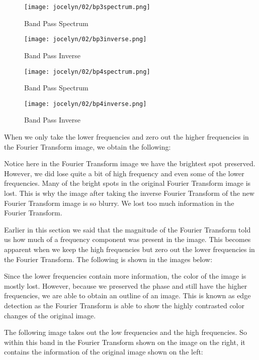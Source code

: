 \documentclass [../article.tex]{subfiles}
\begin{document}
  \begin{figure}[!htb]
      \texttt{[image: jocelyn/02/bp3spectrum.png]}
      \caption{Band Pass Spectrum}
      \label{fig:bp3spectrum}
    \endminipage\hfill
      \texttt{[image: jocelyn/02/bp3inverse.png]}
      \caption{Band Pass Inverse}
      \label{fig:bp3inverse}
    \endminipage
  \end{figure}
  \begin{figure}[!htb]
      \texttt{[image: jocelyn/02/bp4spectrum.png]}
      \caption{Band Pass Spectrum}
      \label{fig:bp4spectrum}
    \endminipage\hfill
      \texttt{[image: jocelyn/02/bp4inverse.png]}
      \caption{Band Pass Inverse}
      \label{fig:bp4inverse}
    \endminipage
  \end{figure}
  When we only take the lower frequencies and zero out the higher
  frequencies in the Fourier Transform image, we obtain the
  following:

  Notice here in the Fourier Transform image we have the brightest
  spot preserved.  However, we did lose quite a bit of high
  frequency and even some of the lower frequencies.  Many of the
  bright spots in the original Fourier Transform image is lost.
  This is why the image after taking the inverse Fourier Transform
  of the new Fourier Transform image is so blurry.  We lost too much
  information in the Fourier Transform.

  Earlier in this section we said that the magnitude of the Fourier
  Transform told us how much of a frequency component was present in
  the image.  This becomes apparent when we keep the high
  frequencies but zero out the lower frequencies in the Fourier
  Transform.  The following is shown in the images below:

  Since the lower frequencies contain more information, the color of
  the image is mostly lost.  However, because we preserved the phase
  and still have the higher frequencies, we are able to obtain an
  outline of an image.  This is known as edge detection as the
  Fourier Transform is able to show the highly contrasted color
  changes of the original image.

  The following image takes out the low frequencies and the high
  frequencies.  So within this band in the Fourier Transform shown
  on the image on the right, it contains the information of the
  original image shown on the left:
\end{document}

